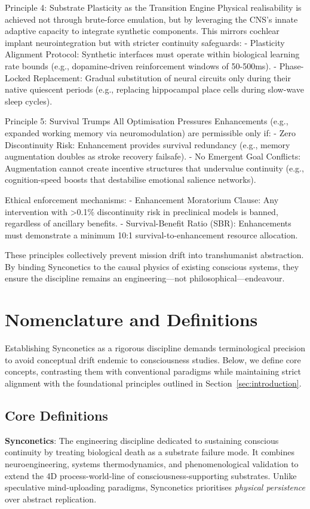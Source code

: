 \documentclass[10pt]{article}
\begin{document}
\begin{sloppypar}
  Principle 4: Substrate Plasticity as the Transition Engine
  Physical realisability is achieved not through brute-force emulation, but by leveraging the CNS’s innate adaptive capacity to integrate synthetic components. This mirrors cochlear implant neurointegration but with stricter continuity safeguards:
  - Plasticity Alignment Protocol: Synthetic interfaces must operate within biological learning rate bounds (e.g., dopamine-driven reinforcement windows of 50-500ms).
  - Phase-Locked Replacement: Gradual substitution of neural circuits only during their native quiescent periods (e.g., replacing hippocampal place cells during slow-wave sleep cycles).

  Principle 5: Survival Trumps All Optimisation Pressures
  Enhancements (e.g., expanded working memory via neuromodulation) are permissible only if:
  - Zero Discontinuity Risk: Enhancement provides survival redundancy (e.g., memory augmentation doubles as stroke recovery failsafe).
  - No Emergent Goal Conflicts: Augmentation cannot create incentive structures that undervalue continuity (e.g., cognition-speed boosts that destabilise emotional salience networks).

  Ethical enforcement mechanisms:
  - Enhancement Moratorium Clause: Any intervention with >0.1\% discontinuity risk in preclinical models is banned, regardless of ancillary benefits.
  - Survival-Benefit Ratio (SBR): Enhancements must demonstrate a minimum 10:1 survival-to-enhancement resource allocation.

  These principles collectively prevent mission drift into transhumanist abstraction. By binding Synconetics to the causal physics of existing conscious systems, they ensure the discipline remains an engineering—not philosophical—endeavour.

  \section{Nomenclature and Definitions}
  \label{sec:nomenclature}

  Establishing Synconetics as a rigorous discipline demands terminological precision to avoid conceptual drift endemic to consciousness studies. Below, we define core concepts, contrasting them with conventional paradigms while maintaining strict alignment with the foundational principles outlined in Section~\ref{sec:introduction}.

  \subsection{Core Definitions}
  \textbf{Synconetics}: The engineering discipline dedicated to sustaining conscious continuity by treating biological death as a substrate failure mode. It combines neuroengineering, systems thermodynamics, and phenomenological validation to extend the 4D process-world-line of consciousness-supporting substrates. Unlike speculative mind-uploading paradigms, Synconetics prioritises \textit{physical persistence} over abstract replication.


\end{sloppypar}
\end{document}
